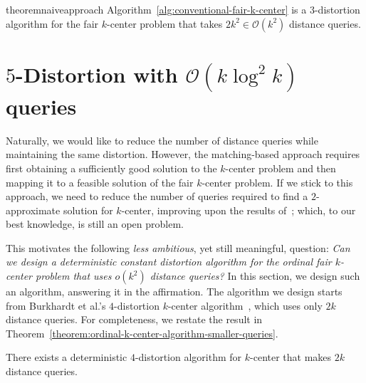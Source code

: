 \documentclass{article}
\newcommand{\bigO}{\ensuremath{\mathcal{O}}\xspace}
\begin{document}


\begin{restatable}{theorem}{naiveapproach}
\label{lemma:naive-approach}
Algorithm~\ref{alg:conventional-fair-k-center} is a $3$-distortion algorithm for the fair $k$-center problem that takes $2k^2 \in \bigO(k^2)$ distance queries.
\end{restatable}





\section{$5$-Distortion with $\bigO(k\log^2 k)$ queries}
\label{sec:analysis-ordinal-fair-k-center-with-limited-distance-queries}


Naturally, we would like to reduce the number of distance queries while maintaining the same distortion. However, the matching-based approach requires first obtaining a sufficiently good solution to the $k$-center problem and then mapping it to a feasible solution of the fair $k$-center problem. If we stick to this approach, we need to reduce the number of queries required to find a $2$-approximate solution for $k$-center, improving upon the results of~\citet{burkhardt2024low}; which, to our best knowledge, is still an open problem.

This motivates the following \emph{less ambitious}, yet still meaningful, question: \emph{Can we design a deterministic constant distortion algorithm for the ordinal fair $k$-center problem that uses $o(k^2)$ distance queries?}
In this section, we design such an algorithm, answering it in the affirmation. The algorithm we design starts from Burkhardt et al.'s $4$-distortion $k$-center algorithm~\cite{burkhardt2024low}, which uses only $2k$ distance queries. For completeness, we restate the result in Theorem~\ref{theorem:ordinal-k-center-algorithm-smaller-queries}.

\begin{theorem}
    \label{theorem:ordinal-k-center-algorithm-smaller-queries}
    There exists a deterministic $4$-distortion algorithm for $k$-center that makes $2k$ distance queries. 
\end{theorem}
\end{document}
